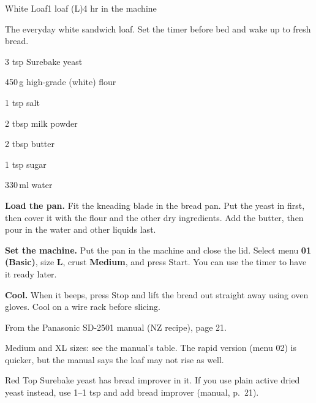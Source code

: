 \begin{recipebox}{White Loaf}{1 loaf (L)}{4 hr in the machine}

The everyday white sandwich loaf. Set the timer before bed and wake up to fresh bread.

\begin{ingredients}
  \item 3 tsp Surebake yeast
  \item 450\,g high-grade (white) flour
  \item 1 tsp salt
  \item 2 tbsp milk powder
  \item 2 tbsp butter
  \item 1 tsp sugar
  \item 330\,ml water
\end{ingredients}

\begin{method}
  \item \textbf{Load the pan.} Fit the kneading blade in the bread pan. Put the yeast in first, then cover it with the flour and the other dry ingredients. Add the butter, then pour in the water and other liquids last.
  \item \textbf{Set the machine.} Put the pan in the machine and close the lid. Select menu \textbf{01 (Basic)}, size \textbf{L}, crust \textbf{Medium}, and press Start. You can use the timer to have it ready later.
  \item \textbf{Cool.} When it beeps, press Stop and lift the bread out straight away using oven gloves. Cool on a wire rack before slicing.
\end{method}

\begin{notelist}
  \item From the Panasonic SD-2501 manual (NZ recipe), page 21.
  \item Medium and XL sizes: see the manual's table. The rapid version (menu 02) is quicker, but the manual says the loaf may not rise as well.
  \item Red Top Surebake yeast has bread improver in it. If you use plain active dried yeast instead, use 1--1 tsp and add bread improver (manual, p.~21).
\end{notelist}

\end{recipebox}
